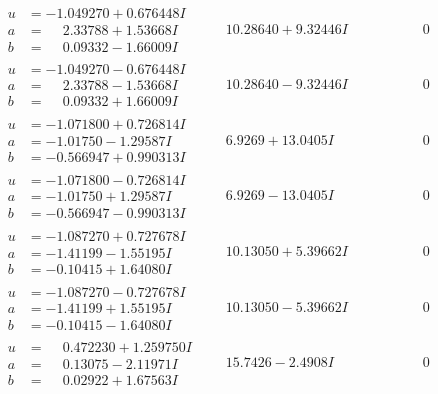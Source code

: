 \documentclass[1p]{elsarticle_modified}
\theoremstyle{definition}
\begin{document}
$$\begin{array}{c|c|c}
\begin{aligned}
u &= -1.049270 + 0.676448 I \\
a &= \phantom{-}2.33788 + 1.53668 I \\
b &= \phantom{-}0.09332 - 1.66009 I\end{aligned}
 & \phantom{-}10.28640 + 9.32446 I & \phantom{-0.000000 } 0 \\ \hline\begin{aligned}
u &= -1.049270 - 0.676448 I \\
a &= \phantom{-}2.33788 - 1.53668 I \\
b &= \phantom{-}0.09332 + 1.66009 I\end{aligned}
 & \phantom{-}10.28640 - 9.32446 I & \phantom{-0.000000 } 0 \\ \hline\begin{aligned}
u &= -1.071800 + 0.726814 I \\
a &= -1.01750 - 1.29587 I \\
b &= -0.566947 + 0.990313 I\end{aligned}
 & \phantom{-}6.9269 + 13.0405 I & \phantom{-0.000000 } 0 \\ \hline\begin{aligned}
u &= -1.071800 - 0.726814 I \\
a &= -1.01750 + 1.29587 I \\
b &= -0.566947 - 0.990313 I\end{aligned}
 & \phantom{-}6.9269 - 13.0405 I & \phantom{-0.000000 } 0 \\ \hline\begin{aligned}
u &= -1.087270 + 0.727678 I \\
a &= -1.41199 - 1.55195 I \\
b &= -0.10415 + 1.64080 I\end{aligned}
 & \phantom{-}10.13050 + 5.39662 I & \phantom{-0.000000 } 0 \\ \hline\begin{aligned}
u &= -1.087270 - 0.727678 I \\
a &= -1.41199 + 1.55195 I \\
b &= -0.10415 - 1.64080 I\end{aligned}
 & \phantom{-}10.13050 - 5.39662 I & \phantom{-0.000000 } 0 \\ \hline\begin{aligned}
u &= \phantom{-}0.472230 + 1.259750 I \\
a &= \phantom{-}0.13075 - 2.11971 I \\
b &= \phantom{-}0.02922 + 1.67563 I\end{aligned}
 & \phantom{-}15.7426 - 2.4908 I & \phantom{-0.000000 } 0 \\ \hline\begin{aligned}

\end{aligned}
\end{array}$$
\end{document}

